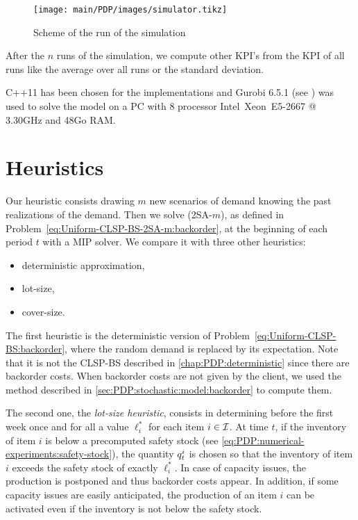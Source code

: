 \begin{figure}[h]
  \centering
  \texttt{[image: main/PDP/images/simulator.tikz]}
  \caption{Scheme of the run of the simulation}
  \label{fig:simulator}
\end{figure}


After the $n$ runs of the simulation, we compute other KPI's from the KPI of all runs like the average over all runs or the standard deviation.


C++11 has been chosen for the implementations and Gurobi 6.5.1 (see \citet{gurobi}) was used to solve the model on a PC with 8 processor Intel\textregistered\ Xeon\texttrademark\ E5-2667 @ 3.30GHz and 48Go RAM.


\section{Heuristics}
\label{sec:PDP:numerical-experiments:heuristics}


Our heuristic consists drawing $m$ new scenarios of demand knowing the past realizations of the demand.
Then we solve (2SA-$m$), as defined in Problem~\eqref{eq:Uniform-CLSP-BS-2SA-m:backorder}, at the beginning of each period $t$ with a MIP solver.
We compare it with three other heuristics:
\begin{itemize}
  \item deterministic approximation,
  \item lot-size,
  \item cover-size.
\end{itemize}


The first heuristic is the deterministic version of Problem~\eqref{eq:Uniform-CLSP-BS:backorder}, where the random demand is replaced by its expectation.
Note that it is not the CLSP-BS described in \cref{chap:PDP:deterministic} since there are backorder costs.
When backorder costs are not given by the client, we used the method described in \cref{sec:PDP:stochastic:model:backorder} to compute them.


The second one, the {\em lot-size heuristic}, consists in determining before the first week once and for all a value $\ell_i^*$ for each item $i\in\mathcal{I}$.
At time $t$, if the inventory of item $i$ is below a precomputed safety stock (see \cref{eq:PDP:numerical-experiments:safety-stock}), the quantity $q_t^i$ is chosen so that the inventory of item $i$ exceeds the safety stock of exactly $\ell_i^*$.
In case of capacity issues, the production is postponed and thus backorder costs appear.
In addition, if some capacity issues are easily anticipated, the production of an item $i$ can be activated even if the inventory is not below the safety stock.


